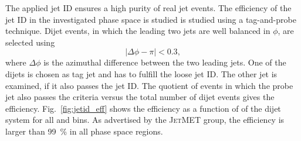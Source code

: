 The applied jet ID ensures a high purity of real jet events. The efficiency of
the jet ID in the investigated phase space is studied is studied using a
tag-and-probe technique. Dijet events, in which the leading two jets are well
balanced in $\phi$, are selected using
%
\begin{equation*}
    | \Delta\phi - \pi | < 0.3,
\end{equation*}
%
where $\Delta\phi$ is the azimuthal difference between the two leading jets. One
of the dijets is chosen as tag jet and has to fulfill the loose jet ID. The
other jet is examined, if it also passes the jet ID. The quotient of events in
which the probe jet also passes the criteria versus the total number of dijet
events gives the efficiency. Fig.~\ref{fig:jetid_eff} shows the
efficiency as a function of \ptavg of the dijet system for all \ystar and
\yboost bins. As advertised by the \textsc{JetMET} group, the efficiency is
larger than \SI{99}{\percent} in all phase space regions.

